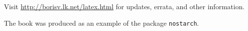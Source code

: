 \documentclass[cfonts]{nostarch}
\theoremstyle{definition}
\theoremstyle{remark}
\begin{document}
\frontmatter


\mainmatter













\backmatter


% 


\printindex

\updatespage

Visit \url{http://borisv.lk.net/latex.html} for updates, errata, and
other information.


\colophon

The book was produced as an example of the package \texttt{nostarch}. 
\end{document}
